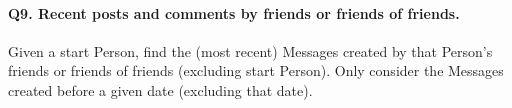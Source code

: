 \paragraph{\textbf{Q9}. Recent posts and comments by friends or friends of friends.}
Given a start Person, find the (most recent) Messages created by that
Person's friends or friends of friends (excluding start Person). Only
consider the Messages created before a given date (excluding that date).
